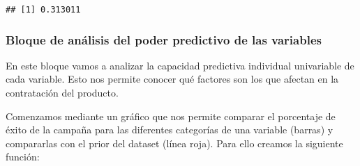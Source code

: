 \documentclass[]{article}
\newenvironment{Shaded}{\begin{snugshade}}{\end{snugshade}}
\newcommand{\KeywordTok}[1]{\textcolor[rgb]{0.13,0.29,0.53}{\textbf{#1}}}
\newcommand{\DecValTok}[1]{\textcolor[rgb]{0.00,0.00,0.81}{#1}}
\newcommand{\OperatorTok}[1]{\textcolor[rgb]{0.81,0.36,0.00}{\textbf{#1}}}
\newcommand{\NormalTok}[1]{#1}
\begin{document}
\begin{Shaded}
\end{Shaded}

\begin{verbatim}
## [1] 0.313011
\end{verbatim}

\subsubsection{Bloque de análisis del poder predictivo de las
variables}\label{bloque-de-analisis-del-poder-predictivo-de-las-variables}

En este bloque vamos a analizar la capacidad predictiva individual
univariable de cada variable. Esto nos permite conocer qué factores son
los que afectan en la contratación del producto.

Comenzamos mediante un gráfico que nos permite comparar el porcentaje de
éxito de la campaña para las diferentes categorías de una variable
(barras) y compararlas con el prior del dataset (línea roja). Para ello
creamos la siguiente función:
\end{document}
